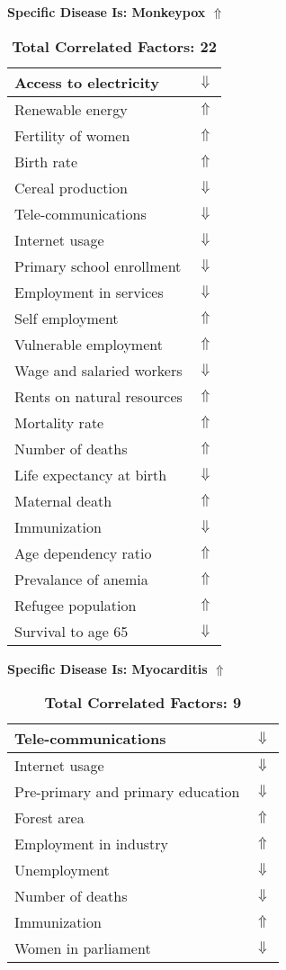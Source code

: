 \documentclass[12pt,notitlepage,oneside]{report}
\begin{document}
\begin{table}[!htb]
\caption{\textbf{Specific Disease Is: Monkeypox $\Uparrow$}}
\centering
\label{Correlated Socio-economic Factors0}
\begin{tabular}{|l|l|}
\hline
Access to electricity & $\Downarrow$\\ \hline
Renewable energy & $\Uparrow$\\ \hline
Fertility of women & $\Uparrow$\\ \hline
Birth rate & $\Uparrow$\\ \hline
Cereal production & $\Downarrow$\\ \hline
Tele-communications & $\Downarrow$\\ \hline
Internet usage & $\Downarrow$\\ \hline
Primary school enrollment & $\Downarrow$\\ \hline
Employment in services & $\Downarrow$\\ \hline
Self employment & $\Uparrow$\\ \hline
Vulnerable employment & $\Uparrow$\\ \hline
Wage and salaried workers & $\Downarrow$\\ \hline
Rents on natural resources & $\Uparrow$\\ \hline
Mortality rate & $\Uparrow$\\ \hline
Number of deaths & $\Uparrow$\\ \hline
Life expectancy at birth & $\Downarrow$\\ \hline
Maternal death & $\Uparrow$\\ \hline
Immunization & $\Downarrow$\\ \hline
Age dependency ratio & $\Uparrow$\\ \hline
Prevalance of anemia & $\Uparrow$\\ \hline
Refugee population & $\Uparrow$\\ \hline
Survival to age 65 & $\Downarrow$\\ \hline
\end{tabular}
\caption*{\textbf{Total Correlated Factors: 22}}
\end{table}
\begin{table}[!htb]
\caption{\textbf{Specific Disease Is: Myocarditis $\Uparrow$}}
\centering
\label{Correlated Socio-economic Factors0}
\begin{tabular}{|l|l|}
\hline
Tele-communications & $\Downarrow$\\ \hline
Internet usage & $\Downarrow$\\ \hline
Pre-primary and primary education & $\Downarrow$\\ \hline
Forest area & $\Uparrow$\\ \hline
Employment in industry & $\Uparrow$\\ \hline
Unemployment & $\Downarrow$\\ \hline
Number of deaths & $\Downarrow$\\ \hline
Immunization & $\Uparrow$\\ \hline
Women in parliament & $\Downarrow$\\ \hline
\end{tabular}
\caption*{\textbf{Total Correlated Factors: 9}}
\end{table}
\end{document}
